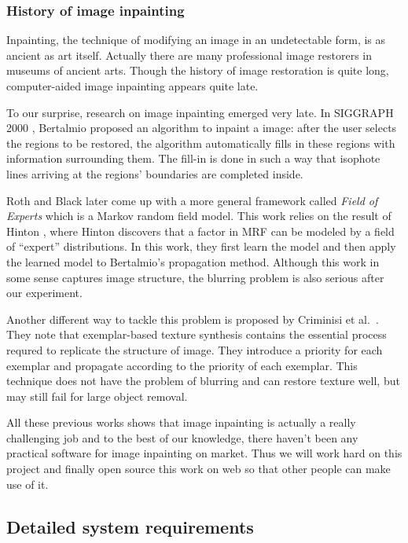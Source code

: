 \subsubsection{History of image inpainting}
Inpainting, the technique of modifying an image in an undetectable form, is as ancient as art itself. Actually there are many professional image restorers in museums of ancient arts. Though the history of image restoration is quite long, computer-aided image inpainting appears quite late.

To our surprise, research on image inpainting emerged very late. In SIGGRAPH 2000 \cite{siggraph00}, Bertalmio proposed an algorithm to inpaint a image: after the user selects the regions to be
restored, the algorithm automatically fills in these regions with information surrounding them. The fill-in is done in such a way that
isophote lines arriving at the regions’ boundaries are completed inside.

Roth and Black \cite{cvpr05} later come up with a more general framework 
called \emph{Field of Experts} which is a Markov random field model. This
work relies on the result of Hinton \cite{neco02}, where Hinton discovers
that a factor in MRF can be modeled by a field of ``expert'' distributions.
In this work, they first learn the model and then apply the learned model
to Bertalmio's propagation method. Although this work in some sense captures
image structure, the blurring problem is also serious after our experiment.

Another different way to tackle this problem is proposed by Criminisi et al.\ 
 \cite{cvpr03,tip04}. They note that exemplar-based texture synthesis
 contains the essential process requred to replicate the structure of image.
 They introduce a priority for each exemplar and propagate according to
 the priority of each exemplar. This technique does not have the problem
 of blurring and can restore texture well, but may still fail for large
 object removal.

All these previous works shows that image inpainting is actually a really challenging job and to the best of our knowledge, there haven't been any practical software for image inpainting on market. Thus we will work hard on this project and finally open source this work on web so that other people can make use of it.

\subsection{Detailed system requirements}
